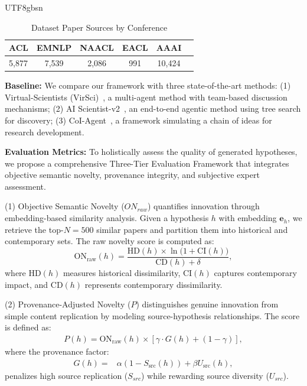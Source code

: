 \documentclass[11pt]{article}
\begin{document}
\begin{CJK}{UTF8}{gbsn}
\begin{table}[H]
\centering
\small
\begin{tabular}{lccccc}
\toprule
\textbf{ACL} & \textbf{EMNLP} & \textbf{NAACL} & \textbf{EACL} & \textbf{AAAI}  \\
\midrule
5,877 & 7,539 & 2,086 & 991 & 10,424  \\
\bottomrule
\end{tabular}
\caption{Dataset Paper Sources by Conference}
\label{tab:dataset_sources}
\end{table}

\textbf{Baseline:} We compare our framework with three state-of-the-art methods: 
(1) Virtual-Scientists (VirSci)~\cite{DBLP:journals/corr/abs-2410-09403}, a multi-agent method with team-based discussion mechanisms; 
(2) AI Scientist-v2~\cite{DBLP:journals/corr/abs-2408-06292}, an end-to-end agentic method using tree search for discovery; 
(3) CoI-Agent~\cite{li2024chain}, a framework simulating a chain of ideas for research development.

\textbf{Evaluation Metrics:} To holistically assess the quality of generated hypotheses, we propose a comprehensive Three-Tier Evaluation Framework that integrates objective semantic novelty, provenance integrity, and subjective expert assessment. 

(1) Objective Semantic Novelty ($ON_{raw}$) quantifies innovation through embedding-based similarity analysis\cite{su-etal-2025-many}. Given a hypothesis $h$ with embedding $\mathbf{e}_h$, we retrieve the top-$N=500$ similar papers and partition them into historical and contemporary sets. The raw novelty score is computed as:
\begin{equation}
   \text{ON}_{\text{raw}}(h) = \frac{\text{HD}(h) \times \ln\big(1 + \text{CI}(h)\big)}{\text{CD}(h) + \delta},
\end{equation}
where $\text{HD}(h)$ measures historical dissimilarity, $\text{CI}(h)$ captures contemporary impact, and $\text{CD}(h)$ represents contemporary dissimilarity. 

(2) Provenance-Adjusted Novelty ($P$) distinguishes genuine innovation from simple content replication by modeling source-hypothesis relationships. The score is defined as:
\begin{equation}
\begin{split}
   P(h) = \text{ON}_{\text{raw}}(h) \times [\gamma \cdot G(h) + (1 - \gamma)],
\end{split}
\end{equation}
where the provenance factor:
\begin{equation}
\begin{split}
    G(h) = &\alpha(1 - S_{\text{src}}(h)) + \beta U_{\text{src}}(h),
\end{split}
\end{equation}
penalizes high source replication ($S_{src}$) while rewarding source diversity ($U_{src}$). 


\end{CJK}
\end{document}
